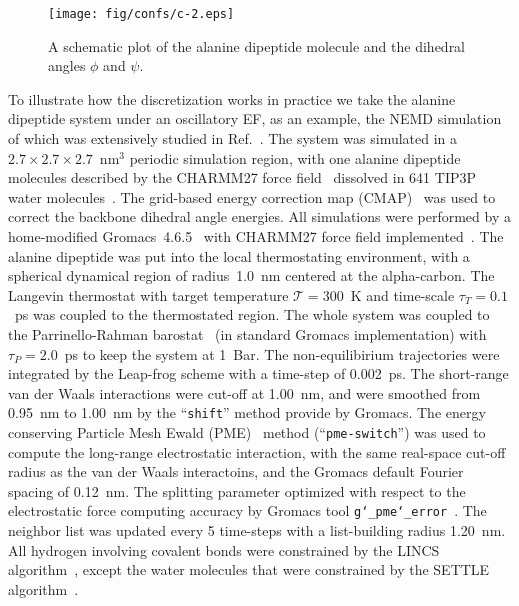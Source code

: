 \documentclass[aps, pre, preprint,unsortedaddress,a4paper,onecolumn]{revtex4}
\begin{document}
\begin{figure}
  \centering
  \texttt{[image: fig/confs/c-2.eps]}
  \caption{A schematic plot of the alanine dipeptide molecule and the dihedral angles $\phi$ and $\psi$.}
  \label{fig:tmp1}
\end{figure}


To illustrate how the discretization works in practice we take the alanine dipeptide system under an oscillatory EF,
as an example, the NEMD simulation of which was
extensively studied in Ref.~\cite{wang2014exploring}.
The system was simulated in a $2.7\times 2.7\times 2.7$~$\textrm{nm}^3$ periodic simulation
region, with one alanine dipeptide molecules described by the CHARMM27 force field~\cite{foloppe2000all} dissolved in 641 TIP3P water molecules~\cite{jorgensen1983comparison}.
The grid-based energy correction map (CMAP)~\cite{mackerell2004extending} was used
to correct the backbone dihedral angle energies.
All simulations were performed by a home-modified
Gromacs~4.6.5~\cite{pronk2013gromacs} with CHARMM27 force field implemented~\cite{bjelkmar2010implementation}.
The alanine dipeptide was put into the local thermostating
environment, with a spherical dynamical region of radius~1.0~nm
centered at the alpha-carbon.
The Langevin thermostat with target temperature $\mathcal T = 300$~K
and time-scale $\tau_T = 0.1$~ps was
coupled to the thermostated region.
The whole system was coupled to the Parrinello-Rahman barostat~\cite{parrinello1981polymorphic} (in standard Gromacs implementation) with $\tau_P = 2.0$~ps to
keep the system at 1~Bar. The non-equilibirium trajectories
were integrated by the Leap-frog scheme with a time-step of 0.002~ps.
The short-range van der Waals interactions were cut-off at 1.00~nm, and were smoothed from
0.95~nm to 1.00~nm by the ``\texttt{shift}'' method provide by Gromacs.
The energy conserving 
Particle Mesh Ewald (PME)~\cite{darden1993pme, essmann1995spm} method (``\texttt{pme-switch}'') was
used to compute the long-range electrostatic interaction,
with the same real-space cut-off radius as the van der Waals interactoins,
and the Gromacs default Fourier spacing of 0.12~nm.
The splitting
parameter optimized with respect to the electrostatic force computing
accuracy by Gromacs tool \texttt{g\char`_pme\char`_error}~\cite{wang2010optimizing}.
The neighbor list was updated every 5 time-steps with a list-building radius 1.20~nm.
All hydrogen involving covalent bonds were constrained by the LINCS algorithm~\cite{hess1997lincs}, except the water molecules that were constrained by the SETTLE algorithm~\cite{miyamoto2004settle}.
\end{document}
